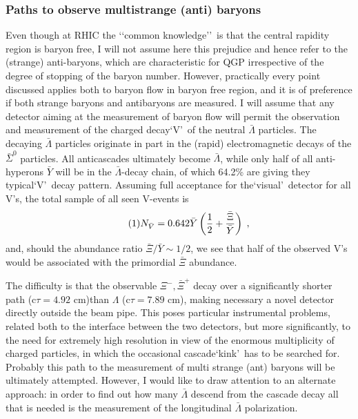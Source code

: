 \begin{mdframed}[linecolor=gray,roundcorner=12pt,backgroundcolor=Dandelion!15,linewidth=1pt,leftmargin=0cm,rightmargin=0cm,topline=true,bottomline=true,skipabove=12pt]
\subsubsection*{\bf Paths to observe multistrange (anti) baryons}
Even though at RHIC the \lq\lq common knowledge\rq\rq\ is that the central rapidity region is baryon free, I will not assume here this prejudice and hence refer to the (strange) anti-baryons, which are characteristic for QGP irrespective of the degree of stopping of the baryon number. However, practically every point discussed applies both to baryon flow in baryon free region, and it is of preference if both strange baryons and antibaryons are measured. I will assume that any detector aiming at the measurement of baryon flow will permit the observation and measurement of the charged decay\lq V\rq\ of the neutral $\bar \Lambda$ particles. The decaying $\bar \Lambda$ particles originate in part in the (rapid) electromagnetic decays of the $\bar \Sigma^0$ particles. All anticascades ultimately become $\bar \Lambda$, while only half of all anti-hyperons $\bar Y$ will be in the $\bar \Lambda$-decay chain, of which 64.2\% are giving they typical\lq V\rq\ decay pattern. Assuming full acceptance for the\lq visual\rq\ detector for all V\rq s, the total sample of all seen V-events is 
\begin{equation}\tag{1}
N_{\bar V}=0.642 \bar Y\left({1 \over 2}+{ {\bar \Xi} \over {\bar Y}}\right)\;,
\end{equation} 
and, should the abundance ratio ${\bar \Xi}/{\bar Y} \sim 1/2$, we see that half of the observed V\rq s would be associated with the primordial $\bar \Xi$ abundance.  

The difficulty is that the observable $\Xi^-, {\bar \Xi^+}$ decay over a significantly shorter path (c$\tau = 4.92$ cm)than $\Lambda$ (c$\tau = 7.89$ cm), making necessary a novel detector directly outside the beam pipe. This poses particular instrumental problems, related both to the interface between the two detectors, but more significantly, to the need for extremely high resolution in view of the enormous multiplicity of charged particles, in which the occasional cascade\lq kink\rq\ has to be searched for. Probably this path to the measurement of multi strange (ant) baryons will be ultimately attempted. However, I would like to draw attention to an alternate approach\footnotemark[16]: in order to find out how many $\bar \Lambda$ descend from the cascade decay all that is needed is the measurement of the longitudinal $\bar \Lambda$ polarization.


\end{mdframed}
